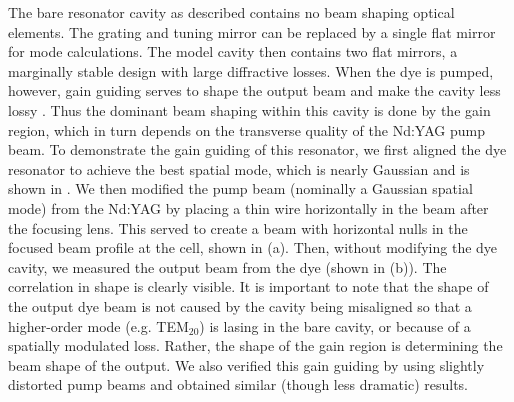 
\begin{figure}[tb]
\bigskip
{}
\end{figure}

\begin{figure}[tb]
\bigskip
{}
\end{figure}

The bare resonator cavity as described contains no beam shaping optical
elements.  The grating and tuning mirror can be replaced by a single flat
mirror for mode calculations.  The model cavity then contains two flat
mirrors, a marginally stable design with large diffractive losses. 
When the dye is pumped, however, gain guiding serves to shape the output beam
and make the cavity less lossy \cite{Casperson:68}.  Thus the dominant beam
shaping within this cavity is done by the gain region, which in turn depends on
the transverse quality of the Nd:YAG pump beam.  To demonstrate the gain guiding
of this resonator, we first aligned the dye resonator to achieve the best
spatial mode, which is nearly Gaussian and is shown in .  We
then modified the  pump beam (nominally a Gaussian spatial mode) from the Nd:YAG
by placing a thin wire horizontally in the beam after the focusing lens.  This
served to create a beam with horizontal nulls in the focused beam profile at the
cell, shown in (a).  Then, without modifying the dye cavity,
we measured the output beam from the dye (shown in
(b)).  The correlation in shape is clearly visible.  It is
important to note that the shape of the output dye beam is not caused by
the cavity being misaligned so that a higher-order mode (e.g. 
TEM$_{20}$) is lasing in the bare cavity, or because of a
spatially modulated loss. Rather, the shape of the gain region is determining
the beam shape of the output.  We also verified this gain guiding by using
slightly distorted pump beams and obtained similar (though less dramatic)
results.

